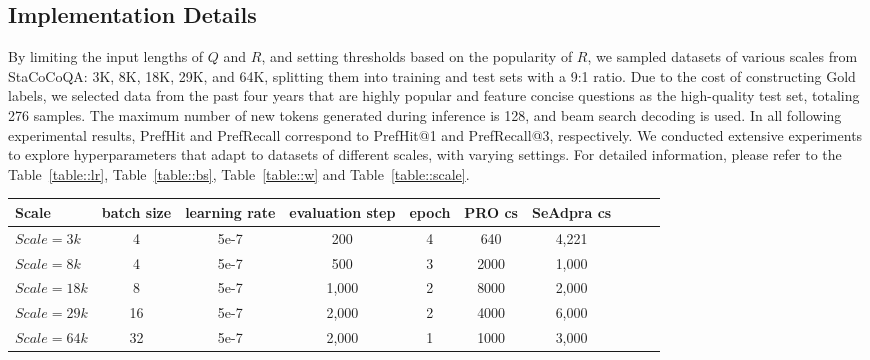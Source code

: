 \subsection{Implementation Details}
\label{sec::imp}

By limiting the input lengths of \(Q\) and \(R\), and setting thresholds based on the popularity of \(R\), we sampled datasets of various scales from StaCoCoQA: 3K, 8K, 18K, 29K, and 64K, splitting them into training and test sets with a 9:1 ratio. Due to the cost of constructing Gold labels, we selected data from the past four years that are highly popular and feature concise questions as the high-quality test set, totaling 276 samples.
The maximum number of new tokens generated during inference is 128, and beam search decoding is used.
In all following experimental results, PrefHit and PrefRecall correspond to PrefHit@1 and PrefRecall@3, respectively.
We conducted extensive experiments to explore hyperparameters that adapt to datasets of different scales, with varying settings. For detailed information, please refer to the Table~\ref{table::lr}, Table~\ref{table::bs}, Table~\ref{table::w} and Table~\ref{table::scale}.
\begin{table*}[t]
  \renewcommand{\arraystretch}{1.1}
\centering
\caption{Hyperparameter Settings for Training Datasets of Different Scales. The cs represents the convergence step}
  \tabcolsep=0.3cm
  \begin{tabular}{ lcc cccc ccc}
    \toprule
     Scale & batch size &learning rate & evaluation step & epoch & PRO cs & SeAdpra cs  \\ \midrule
        \(Scale=3k\) & 4 & 5e-7 & 200 & 4 &640  & 4,221 \\ 
         \(Scale=8k\) & 4 & 5e-7 & 500 & 3 &2000  &1,000 \\ 
         \(Scale=18k\) & 8 & 5e-7 & 1,000 & 2 & 8000& 2,000 \\ 
         \(Scale=29k\)& 16 & 5e-7& 2,000 & 2 &4000& 6,000\\ 
         \(Scale=64k\) & 32 & 5e-7 & 2,000 & 1&1000 & 3,000\\ 
  \bottomrule
\end{tabular}
\label{table::scale}
\end{table*}

